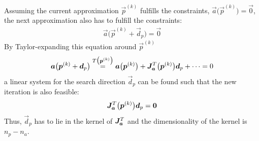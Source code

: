 				Assuming the current approximation \( \vec{p}^{(k)} \) fulfills the constraints, \( \vec{a}\big(\vec{p}^{(k)}\big) = \vec{0} \), the next approximation also has to fulfill the constraints:
				\begin{align*}
					\vec{a}\big(\vec{p}^{(k)} + \vec{d}_p\big) = \vec{0}
				\end{align*}
				By Taylor-expanding this equation around \( \vec{p}^{(k)} \)
				\begin{align*}
					\bm{a}\big(\bm{p}^{(k)} + \bm{d}_p\big) \overset{T\big(\bm{p}^{(k)}\big)}{=} \bm{a}\big(\bm{p}^{(k)}\big) + \bm{J}_{\bm{a}}^T\big(\bm{p}^{(k)}\big) \bm{d}_p + \cdots = 0
				\end{align*}
				a linear system for the search direction \( \vec{d}_p \) can be found such that the new iteration is also feasible:
				\begin{align*}
					\bm{J}_{\bm{a}}^T\big(\bm{p}^{(k)}\big) \bm{d}_p = \bm{0}
				\end{align*}
				Thus, \( \vec{d}_p \) has to lie in the kernel of \( \bm{J}_{\bm{a}}^T \) and the dimensionality of the kernel is \( n_p - n_a \).

